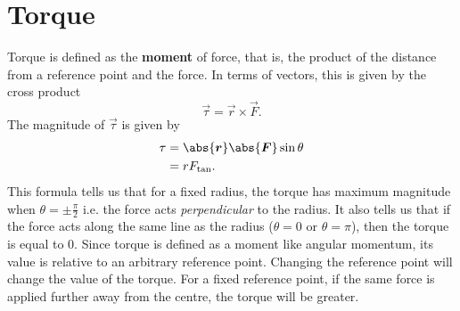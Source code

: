 \documentclass[../classical_mechanics.tex]{subfiles}
\begin{document}
    \section{Torque}\label{sec:torque}
        Torque is defined as the \textbf{moment} of force, that is, the product of the distance from a reference point and the force.
        In terms of vectors, this is given by the cross product
        \begin{equation}
            \vec{\tau}=\vec{r}\times\vec{F}.
        \end{equation}
        The magnitude of $\vec{\tau}$ is given by
        \begin{align}
            \tau&=\abs{\vec{r}}\abs{\vec{F}}\sin\theta\\
            &=rF_\text{tan}.
        \end{align}
        This formula tells us that for a fixed radius, the torque has maximum magnitude when $\theta=\pm\frac{\pi}{2}$ i.e. the force acts \textit{perpendicular} to the radius.
        It also tells us that if the force acts along the same line as the radius ($\theta=0$ or $\theta=\pi$), then the torque is equal to 0.
        Since torque is defined as a moment like angular momentum, its value is relative to an arbitrary reference point.
        Changing the reference point will change the value of the torque.
        For a fixed reference point, if the same force is applied further away from the centre, the torque will be greater.
        
\end{document}
